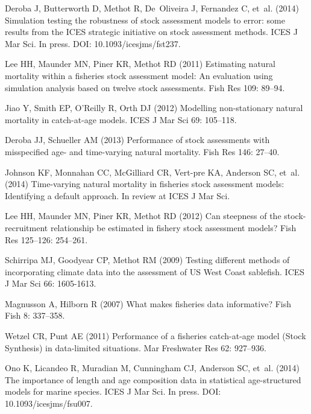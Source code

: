\documentclass[11pt]{article}
\begin{document}
\begin{spacing}{1.2}
\begin{thebibliography}{10}
Deroba J, Butterworth D, Methot R, De~Oliveira J, Fernandez C, et~al. (2014)
  Simulation testing the robustness of stock assessment models to error: some
  results from the {ICES} strategic initiative on stock assessment methods.
\newblock ICES J Mar Sci. In press. DOI: 10.1093/icesjms/fst237.

Lee HH, Maunder MN, Piner KR, Methot RD (2011) Estimating natural mortality
  within a fisheries stock assessment model: An evaluation using simulation
  analysis based on twelve stock assessments.
\newblock Fish Res 109: 89--94.

Jiao Y, Smith EP, O'Reilly R, Orth DJ (2012) Modelling non-stationary natural
  mortality in catch-at-age models.
\newblock ICES J Mar Sci 69: 105--118.

Deroba JJ, Schueller AM (2013) Performance of stock assessments with
  misspecified age- and time-varying natural mortality.
\newblock Fish Res 146: 27--40.

Johnson KF, Monnahan CC, McGilliard CR, Vert-pre KA, Anderson SC, et~al. (2014)
  Time-varying natural mortality in fisheries stock assessment models:
  Identifying a default approach.
\newblock In review at ICES J Mar Sci.

Lee HH, Maunder MN, Piner KR, Methot RD (2012) Can steepness of the
  stock-recruitment relationship be estimated in fishery stock assessment
  models?
\newblock Fish Res 125--126: 254--261.

Schirripa MJ, Goodyear CP, Methot RM (2009) Testing different methods of
  incorporating climate data into the assessment of {US West Coast} sablefish.
\newblock ICES J Mar Sci 66: 1605-1613.

Magnusson A, Hilborn R (2007) What makes fisheries data informative?
\newblock Fish Fish 8: 337--358.

Wetzel CR, Punt AE (2011) Performance of a fisheries catch-at-age model ({Stock
  Synthesis}) in data-limited situations.
\newblock Mar Freshwater Res 62: 927--936.

Ono K, Licandeo R, Muradian M, Cunningham CJ, Anderson SC, et~al. (2014) The
  importance of length and age composition data in statistical age-structured
  models for marine species.
\newblock ICES J Mar Sci. In press. DOI: 10.1093/icesjms/fsu007.


\end{thebibliography}
\end{spacing}
\end{document}
